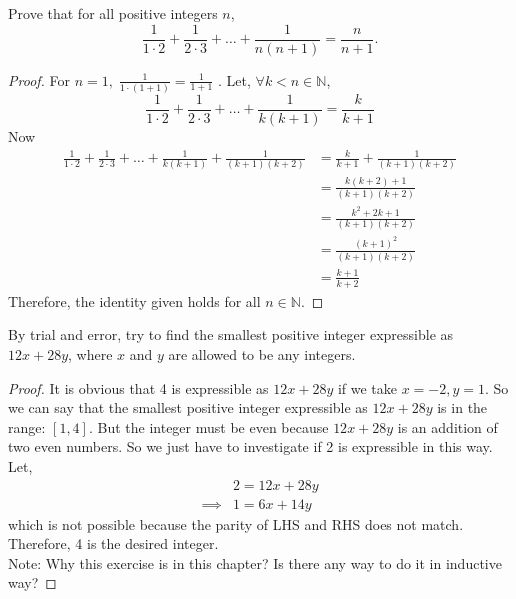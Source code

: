 \documentclass[12pt]{article}
\newenvironment{problem}[2][Problem]{\begin{trivlist}
\item[\hskip \labelsep {\bfseries #1}\hskip \labelsep {\bfseries #2.}]}{\end{trivlist}}
\begin{document}
\begin{problem}{8}
Prove that for all positive integers \( n \),
\[
\frac{1}{1 \cdot 2} + \frac{1}{2 \cdot 3} + \dots + \frac{1}{n(n + 1)} = \frac{n}{n + 1}.
\]

\end{problem}

\begin{proof}
For $n = 1, \; \frac{1}{1 \cdot (1+1)} = \frac{1}{1 + 1}$ .
Let, $\forall k < n \in \mathbb{N}$, \\
\[
\frac{1}{1 \cdot 2} + \frac{1}{2 \cdot 3} + \dots + \frac{1}{k(k + 1)} = \frac{k}{k + 1}
\]
Now \\
\begin{align*}
\frac{1}{1 \cdot 2} + \frac{1}{2 \cdot 3} + \dots + \frac{1}{k(k + 1)} + \frac{1}{(k+1)(k+2)}
& = \frac{k}{k + 1} + \frac{1}{(k+1)(k+2)} \\
& = \frac{k(k+2) + 1}{(k+1)(k+2)} \\
& = \frac{k^2 + 2k + 1}{(k+1)(k+2)} \\
& = \frac{(k+1)^2}{(k+1)(k+2)} \\
& = \frac{k + 1}{k + 2}
\end{align*}
Therefore, the identity given holds for all $n \in \mathbb{N}$.

\end{proof}

\begin{problem}{9}
By trial and error, try to find the smallest positive integer expressible as \( 12x + 28y \),
where \( x \) and \( y \) are allowed to be any integers.

\end{problem}

\begin{proof}
It is obvious that 4 is expressible as $12x + 28y$ if we take $x = -2, y = 1$. So we can say that the smallest positive integer expressible as $12x + 28y$ is in the range: $[1, 4]$. But the integer must be even because $12x + 28y$ is an addition of two even numbers. So we just have to investigate if 2 is expressible in this way. \\
Let,
\begin{align*}
& 2 = 12x + 28y \\
\implies & 1 = 6x + 14y
\end{align*}
which is not possible because the parity of LHS and RHS does not match. Therefore, 4 is the desired integer. \\
Note: Why this exercise is in this chapter? Is there any way to do it in inductive way?

\end{proof}
\end{document}
